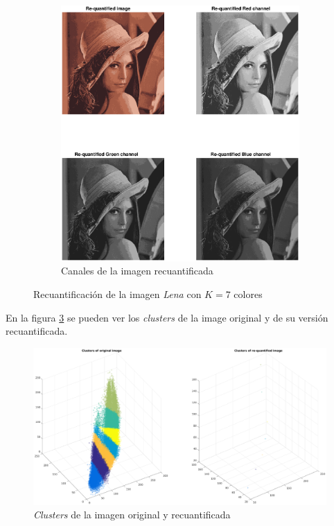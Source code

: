 \documentclass[11pt]{article} %
\begin{document}
\begin{figure}[h]
\begin{subfigure}[b]{0.435\textwidth}
        \includegraphics[width=\textwidth]{../src/fig/22_requantified_lena.eps}
        \caption[]{Canales de la imagen recuantificada}
        \label{fig:22:requant:rgb}
    \end{subfigure}
    \caption{Recuantificación de la imagen \emph{Lena} con $K=7$ colores}
    \label{fig:22:classification}
\end{figure}

En la figura \ref{fig:22:clusters} se pueden ver los \emph{clusters} de la
image original y de su versión recuantificada.

\begin{figure}[h]
    \includegraphics[width=\textwidth, height=6cm]{../src/fig/22_lena_clusters.eps}
    \caption[]{\emph{Clusters} de la imagen original y recuantificada}
    \label{fig:22:clusters}
\end{figure}
\end{document}
